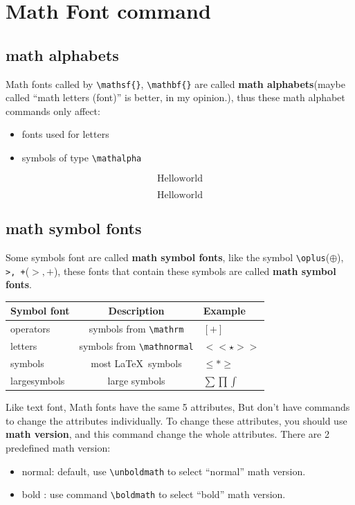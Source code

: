 \documentclass{article}
\begin{document}
\section{Math Font command}
\subsection{math alphabets}
Math fonts called by \verb|\mathsf{}|, \verb|\mathbf{}| are called \textbf{math alphabets}(maybe 
called ``math letters (font)'' is better, in my opinion.), thus these math alphabet commands only affect:
\begin{itemize}
  \item fonts used for letters
  \item symbols of type \verb|\mathalpha|
\end{itemize}

\begin{code}
\[\mathrm{Hello world}\]


\renewcommand{\rmdefault}{ptm}
\[\mathrm{Hello world}\]
\end{code}


\subsection{math symbol fonts}
Some symbols font are called \textbf{math symbol fonts},  like the symbol \verb|\oplus|($\oplus$), \verb|>, +|($>, +$), these 
fonts that contain these symbols are called \textbf{math symbol fonts}.

\begin{center}
  \begin{tabular}{lcl}
    \hline
    Symbol font & Description & Example \\[.5em]
    \hline
    operators & symbols from \verb|\mathrm| & $[+]$ \\[.5em]
    letters   & symbols from \verb|\mathnormal|    & $<<\star>>$ \\[.5em]
    symbols   & most \LaTeX\ symbols        & $\le *\ge$ \\[.5em]
    largesymbols & large symbols            & $\sum\prod\int$ \\[.5em]
    \hline
  \end{tabular}
\end{center}

Like text font, Math fonts have the same 5 attributes, But don't have commands to change the attributes individually. 
To change these attributes, you should use \textbf{math version}, and this command change the whole attributes. There 
are 2 predefined math version:
\begin{itemize}
  \item normal: default, use \verb|\unboldmath| to select ``normal'' math version.
  \item bold : use command \verb|\boldmath| to select ``bold'' math version.
\end{itemize}
\end{document}

